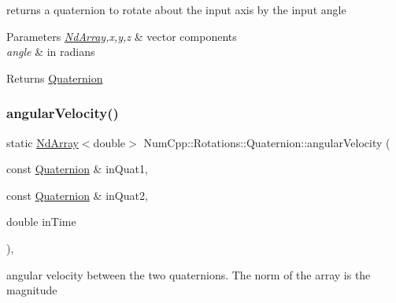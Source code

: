 returns a quaternion to rotate about the input axis by the input angle


\begin{DoxyParams}{Parameters}
{\em \mbox{\hyperlink{class_num_cpp_1_1_nd_array}{Nd\+Array}},x,y,z} & vector components \\
\hline
{\em angle} & in radians \\
\hline
\end{DoxyParams}
\begin{DoxyReturn}{Returns}
\mbox{\hyperlink{class_num_cpp_1_1_rotations_1_1_quaternion}{Quaternion}} 
\end{DoxyReturn}
\mbox{\label{class_num_cpp_1_1_rotations_1_1_quaternion_a0dac9684e14722df14519657d1470303}} 
\subsubsection{\texorpdfstring{angular\+Velocity()}{angularVelocity()}\hspace{0.1cm}{\footnotesize\ttfamily [1/2]}}
{\footnotesize\ttfamily static \mbox{\hyperlink{class_num_cpp_1_1_nd_array}{Nd\+Array}}$<$double$>$ Num\+Cpp\+::\+Rotations\+::\+Quaternion\+::angular\+Velocity (\begin{DoxyParamCaption}\item[{const \mbox{\hyperlink{class_num_cpp_1_1_rotations_1_1_quaternion}{Quaternion}} \&}]{in\+Quat1,  }\item[{const \mbox{\hyperlink{class_num_cpp_1_1_rotations_1_1_quaternion}{Quaternion}} \&}]{in\+Quat2,  }\item[{double}]{in\+Time }\end{DoxyParamCaption})\hspace{0.3cm}{\ttfamily [inline]}, {\ttfamily [static]}}

angular velocity between the two quaternions. The norm of the array is the magnitude


